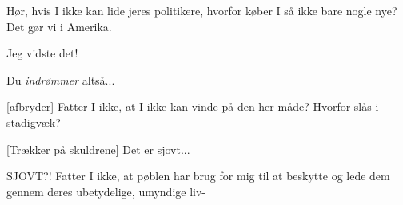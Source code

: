 \documentclass[a4paper,11pt]{article}
\begin{document}
\begin{sketch}
 Hør, hvis I ikke kan lide jeres politikere, hvorfor køber I så
ikke bare nogle nye?   Det
gør vi i Amerika.

 Jeg vidste det!

 Du \textit{indrømmer} altså...

[afbryder] Fatter I ikke, at I ikke kan vinde på den her måde?
Hvorfor slås i stadigvæk?

[Trækker på skuldrene] Det er sjovt...

 SJOVT?!  Fatter I ikke, at pøblen har brug for mig til at
beskytte og lede dem gennem deres ubetydelige, umyndige liv-



\end{sketch}
\end{document}
